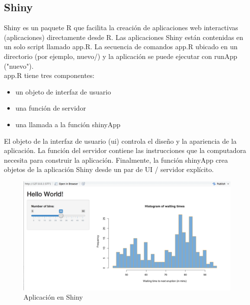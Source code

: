 \subsection{Shiny}

Shiny es un paquete R que facilita la creaci\'on de aplicaciones web interactivas (aplicaciones) directamente desde R. Las aplicaciones Shiny est\'an contenidas en un solo script llamado app.R. La secuencia de comandos app.R ubicado en un directorio (por ejemplo, nuevo/) y la aplicaci\'on se puede ejecutar con runApp ("nuevo").\\

app.R tiene tres componentes:

   \begin{itemize}
     \item un objeto de interfaz de usuario
     \item una funci\'on de servidor
     \item una llamada a la funci\'on shinyApp
     \end{itemize}

El objeto de la interfaz de usuario (ui) controla el diseño y la apariencia de la aplicaci\'on. La funci\'on del servidor contiene las instrucciones que la computadora necesita para construir la aplicaci\'on. Finalmente, la funci\'on shinyApp crea objetos de la aplicación Shiny desde un par de UI / servidor expl\'icito.

\begin{figure}[H]
\centering
\includegraphics[scale=0.5]{shiny.png}
\caption{Aplicaci\'on en Shiny}
\end{figure}
